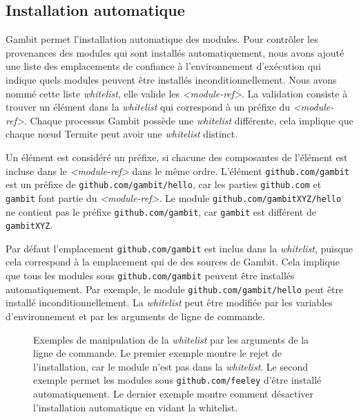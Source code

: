 \subsection{Installation automatique}
Gambit permet l'installation automatique des modules. Pour contrôler les
provenances des modules qui sont installés automatiquement, nous avons
ajouté une liste des emplacements de confiance à l'environnement d'exécution
qui indique quels modules peuvent être installés inconditionnellement.
Nous avons nommé cette liste \textit{whitelist}, elle valide les
\textit{<module-ref>}.  La validation consiste à trouver un
élément dans la \textit{whitelist} qui correspond à un préfixe du
\textit{<module-ref>}. Chaque processus Gambit possède une
\textit{whitelist} différente, cela implique que chaque nœud Termite
peut avoir une \textit{whitelist} distinct.


Un élément est considéré un préfixe, si chacune des composantes de l'élément
est incluse dans le \textit{<module-ref>} dans le même ordre. L'élément
\texttt{github.com/gambit} est un préfixe de \texttt{github.com/gambit/hello},
car les parties \texttt{github.com} et \texttt{gambit} font partie du
\textit{<module-ref>}. Le module \texttt{github.com/gambitXYZ/hello} ne
contient pas le préfixe \texttt{github.com/gambit}, car \texttt{gambit} est
différent de \texttt{gambitXYZ}.

Par défaut l'emplacement \texttt{github.com/gambit} est inclus dans la
\textit{whitelist}, puisque cela correspond à la emplacement qui de des
sources de Gambit.  Cela implique que tous les modules sous
\texttt{github.com/gambit} peuvent être installés automatiquement. Par exemple,
le module \texttt{github.com/gambit/hello} peut être installé
inconditionnellement. La \textit{whitelist} peut être modifiée par
les variables d'environnement et par les arguments de ligne de commande.

\begin{figure}[ht]
  \centering
  \caption{Exemples de manipulation de la {\it whitelist} par
    les arguments de la ligne de commande. Le premier exemple
    montre le rejet de l'installation, car le module n'est pas dans la
    \textit{whitelist}. Le second exemple permet les modules sous
    \texttt{github.com/feeley} d'être installé automatiquement.
    Le dernier exemple montre comment désactiver l'installation automatique
    en vidant la whitelist.}
  \label{fig:whitelist_manipulation}
\end{figure}

